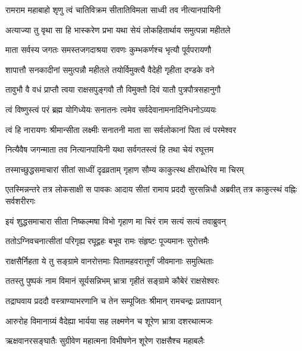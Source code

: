 \twolineshloka
{रामराम महाबाहो शृणु त्वं चातिविक्रम}
{सीतातिविमला साध्वी तव नीत्यानपायिनी}%

\twolineshloka
{अत्याज्या तु वृथा सा हि भास्करेण प्रभा यथा}
{सेयं लोकहितार्थाय समुत्पन्ना महीतले}%

\twolineshloka
{माता सर्वस्य जगतः समस्तजगदाश्रया}
{रावणः कुम्भकर्णश्च भृत्यौ पूर्वपरायणौ}%

\twolineshloka
{शापात्तौ सनकादीनां समुत्पन्नौ महीतले}
{तयोर्विमुक्त्यै वैदेही गृहीता दण्डके वने}%

\twolineshloka
{तावुभौ वै वधं प्राप्तौ त्वया राक्षसपुङ्गवौ}
{तौ विमुक्तौ दिवं यातौ पुत्रपौत्रसहानुगौ}%

\twolineshloka
{त्वं विष्णुस्त्वं परं ब्रह्म योगिध्येयः सनातनः}
{त्वमेव सर्वदेवानामनादिनिधनोऽव्ययः}%

\twolineshloka
{त्वं हि नारायणः श्रीमान्सीता लक्ष्मीः सनातनी}
{माता सा सर्वलोकानां पिता त्वं परमेश्वर}%

\twolineshloka
{नित्यैवैष जगन्माता तव नित्यानपायिनी}
{यथा सर्वगतस्त्वं हि तथा चेयं रघूत्तम}%

\twolineshloka
{तस्माच्छुद्धसमाचारां सीतां साध्वीं दृढव्रताम्}
{गृहाण सौम्य काकुत्स्थ क्षीराब्धेरिव मा चिरम्}%



\threelineshloka
{एतस्मिन्नन्तरे तत्र लोकसाक्षी स पावकः}
{आदाय सीतां रामाय प्रददौ सुरसन्निधौ}
{अब्रवीत् तत्र काकुत्स्थं वह्निः सर्वशरीरगः}%


\twolineshloka
{इयं शुद्धसमाचारा सीता निष्कल्मषा विभो}
{गृहाण मा चिरं राम सत्यं सत्यं तवाब्रुवन्}%


\twolineshloka
{ततोऽग्निवचनात्सीतां परिगृह्य रघूद्वहः}
{बभूव रामः संहृष्टः पूज्यमानः सुरोत्तमैः}%

\twolineshloka
{राक्षसैर्निहता ये तु सङ्ग्रामे वानरोत्तमाः}
{पितामहवरात्तूर्णं जीवमानाः समुत्थिताः}%

\twolineshloka
{ततस्तु पुष्पकं नाम विमानं सूर्यसन्निभम्}
{भ्रात्रा गृहीतं सङ्ग्रामे कौबेरं राक्षसेश्वरः}%

\twolineshloka
{तद्राघवाय प्रददौ वस्त्राण्याभरणानि च}
{तेन सम्पूजितः श्रीमान् रामचन्द्रः प्रतापवान्}%

\twolineshloka
{आरुरोह विमानाग्र्यं वैदेह्या भार्यया सह}
{लक्ष्मणेन च शूरेण भ्रात्रा दशरथात्मजः}%

\twolineshloka
{ऋक्षवानरसङ्घातैः सुग्रीवेण महात्मना}
{विभीषणेन शूरेण राक्षसैश्च महाबलैः}%

